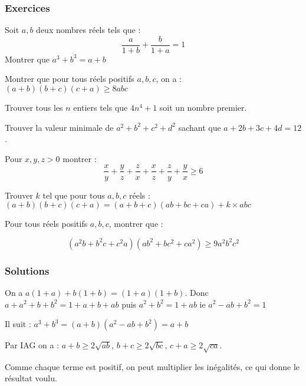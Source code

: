 \author{Auguste de Lambilly}

\subsubsection{Exercices}


\begin{exo}
Soit $a,b$ deux nombres réels tels que : 
$$ \frac{a}{1+b}+\frac{b}{1+a}=1 $$
Montrer que $ a^3+b^3=a+b$
\end{exo}

\begin{exo}
Montrer que pour tous réels positifs $a,b,c$, on a : $ (a+b)(b+c)(c+a)\geq 8abc$
\end{exo}


\begin{exo}
Trouver tous les $n$ entiers tels que $4n^4+1$ soit un nombre premier.
\end{exo}


\begin{exo}
Trouver la valeur minimale de $a^2+b^2+c^2+d^2$ sachant que $a+2b+3c+4d=12$.
\end{exo}


\begin{exo}
Pour $x,y,z>0$ montrer : $$ \frac{x}{y}+\frac{y}{z}+\frac{z}{x}+\frac{x}{z}+\frac{z}{y}+\frac{y}{x}\geq 6$$
\end{exo}


\begin{exo}
Trouver $k$ tel que pour tous $a,b,c$ réels : 
$(a+b)(b+c)(c+a)=(a+b+c)(ab+bc+ca)+k\times abc $
\end{exo}


\begin{exo}
Pour tous réels positifs $a,b,c$, montrer que :

$$ (a^2b+b^2c+c^2a)(ab^2+bc^2+ca^2)\geq 9a^2b^2c^2$$
\end{exo}


\subsubsection{Solutions}


\begin{sol}
On a $a(1+a)+b(1+b)=(1+a)(1+b)$. Donc $a+a^2+b+b^2=1+a+b+ab$ puis $a^2+b^2=1+ab$ ie $a^2-ab+b^2=1$

Il suit : $ a^3+b^3=(a+b)(a^2-ab+b^2)=a+b$
\end{sol}


\begin{sol}
Par IAG on a : $a+b\geq 2\sqrt{ab}$, $b+c\geq 2\sqrt{bc}$, $c+a\geq 2\sqrt{ca}$.

Comme chaque terme est positif, on peut multiplier les inégalités, ce qui donne le résultat voulu.
\end{sol}


